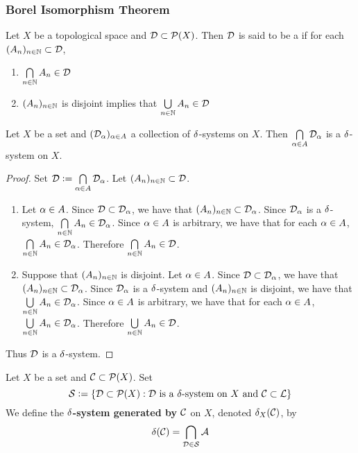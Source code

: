 \documentclass{book}
\begin{document}
	\subsubsection{Borel Isomorphism Theorem}
	
	\begin{defn} 
		Let $X$ be a topological space and $\mathcal{D} \subset \mathcal{P}(X)$. Then $\mathcal{D}$ is said to be a  if for each $(A_n)_{n \in \mathbb{N}} \subset \mathcal{D}$,
		\begin{enumerate}
			\item $\bigcap\limits_{n \in \mathbb{N}} A_n \in \mathcal{D}$
			\item $(A_n)_{n \in \mathbb{N}}$ is disjoint implies that $\bigcup\limits_{n \in \mathbb{N}} A_n \in \mathcal{D}$
		\end{enumerate}
	\end{defn}
	
	\begin{ex} 
		Let $X$ be a set and $(\mathcal{D}_\alpha)_{\alpha \in A}$ a collection of $\delta$-systems on $X$. Then $\bigcap\limits_{\alpha \in A}\mathcal{D}_{\alpha}$ is a $\delta$-system on $X$.
	\end{ex}
	
	\begin{proof}
		Set $\mathcal{D} \vcentcolon= \bigcap\limits_{\alpha \in A} \mathcal{D}_{\alpha}$. Let $(A_n)_{n \in \mathbb{N}} \subset \mathcal{D}$.
		\begin{enumerate}
			\item Let $\alpha \in A$. Since $\mathcal{D} \subset \mathcal{D}_{\alpha}$, we have that $(A_n)_{n \in \mathbb{N}} \subset \mathcal{D}_{\alpha}$. Since $\mathcal{D}_{\alpha}$ is a $\delta$-system, $\bigcap\limits_{n \in \mathbb{N}} A_n \in \mathcal{D}_{\alpha}$. Since $\alpha \in A$ is arbitrary, we have that for each $\alpha \in A$, $\bigcap\limits_{n \in \mathbb{N}} A_n \in \mathcal{D}_{\alpha}$. Therefore $\bigcap\limits_{n \in \mathbb{N}} A_n \in \mathcal{D}$.   
			\item Suppose that $(A_n)_{n \in \mathbb{N}}$ is disjoint. Let $\alpha \in A$. Since $\mathcal{D} \subset \mathcal{D}_{\alpha}$, we have that $(A_n)_{n \in \mathbb{N}} \subset \mathcal{D}_{\alpha}$. Since $\mathcal{D}_{\alpha}$ is a $\delta$-system and $(A_n)_{n \in \mathbb{N}}$ is disjoint, we have that $\bigcup\limits_{n \in \mathbb{N}} A_n \in \mathcal{D}_{\alpha}$. Since $\alpha \in A$ is arbitrary, we have that for each $\alpha \in A$, $\bigcup\limits_{n \in \mathbb{N}} A_n \in \mathcal{D}_{\alpha}$. Therefore $\bigcup\limits_{n \in \mathbb{N}} A_n \in \mathcal{D}$.   
		\end{enumerate}
		Thus $\mathcal{D}$ is a $\delta$-system.
	\end{proof}
	
	\begin{defn} 
		Let $X$ be a set and $\mathcal{C} \subset \mathcal{P}(X)$. Set 
		$$\mathcal{S} \vcentcolon= \{\mathcal{D} \subset \mathcal{P}(X): \mathcal{D} \text{ is a $\delta$-system on $X$ and $\mathcal{C} \subset \mathcal{L}$} \}$$ 
		We define the \textbf{$\delta$-system generated by $\mathcal{C}$} on $X$, denoted $\delta_X(\mathcal{C})$, by $$\delta(\mathcal{C}) = \bigcap_{\mathcal{D} \in \mathcal{S}} \mathcal{A} $$
	\end{defn}
	
\end{document}
